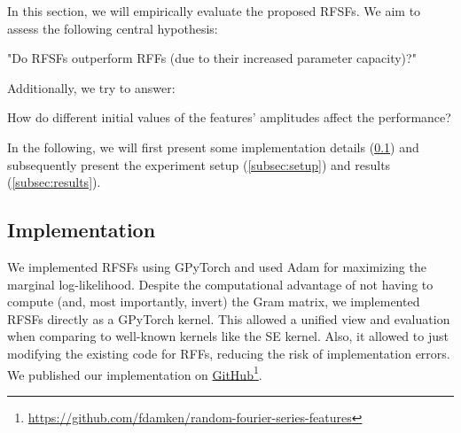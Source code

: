 
In this section, we will empirically evaluate the proposed \acp{RFSF}.
We aim to assess the following central hypothesis:
\begin{hypothesis}
	"Do \acp{RFSF} outperform \acp{RFF} (due to their increased parameter capacity)?"
	\label{hyp:rfsfAreBetter}
\end{hypothesis}
Additionally, we try to answer:
\begin{hypothesis}
	How do different initial values of the features' amplitudes affect the performance?
	\label{hyp:initialValues}
\end{hypothesis}
In the following, we will first present some implementation details (\cref{subsec:impl}) and subsequently present the experiment setup (\cref{subsec:setup}) and results (\cref{subsec:results}).


\subsection{Implementation}  \label{subsec:impl}
	We implemented \acp{RFSF} using GPyTorch\cite{jacotNeuralTangentKernel2020} and used Adam\cite{kingmaAdamMethodStochastic2017a} for maximizing the marginal log-likelihood.
	Despite the computational advantage of not having to compute (and, most importantly, invert) the Gram matrix, we implemented \acp{RFSF} directly as a GPyTorch kernel.
	This allowed a unified view and evaluation when comparing to well-known kernels like the \ac{SE} kernel.
	Also, it allowed to just modifying the existing code for \acp{RFF}, reducing the risk of implementation errors.
	We published our implementation on \href{https://github.com/fdamken/random-fourier-series-features}{GitHub}\footnote{\url{https://github.com/fdamken/random-fourier-series-features}}.


